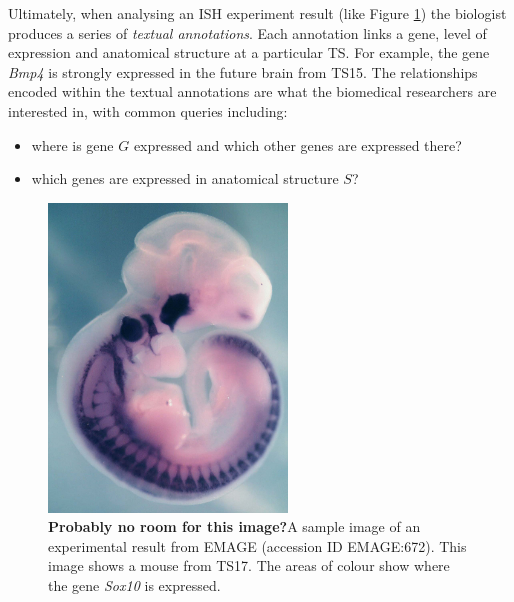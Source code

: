 Ultimately, when analysing an ISH experiment result (like Figure \ref{fig:emageResult}) the biologist produces a series of \emph{textual annotations}.  Each annotation links a gene, level of expression and anatomical structure at a particular TS.  For example, the gene \emph{Bmp4} is strongly expressed in the future brain from TS15.  The relationships encoded within the textual annotations are what the biomedical researchers are interested in, with common queries including:
\begin{itemize}
\item where is gene $G$ expressed and which other genes are expressed there?
\item which genes are expressed in anatomical structure $S$?
\end{itemize}

\begin{figure}[h] %
   \centering
   \includegraphics[width=2.5in]{images/emage672} 
   \caption{\textbf{Probably no room for this image?}A sample image of an experimental result from EMAGE (accession ID EMAGE:672).  This image shows a mouse from TS17.  The areas of colour show where the gene \emph{Sox10} is expressed.}
   \label{fig:emageResult}
\end{figure}



